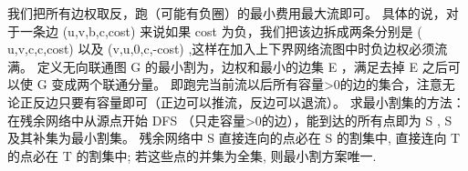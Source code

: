 {}
\markdownRendererSectionEnd \markdownRendererSectionBegin
{}\markdownRendererInterblockSeparator
{}我们把所有边权取反，跑（可能有负圈）的最小费用最大流即可。\markdownRendererParagraphSeparator
{}具体的说，对于一条边\markdownRendererDollarSign{} (u,v,b,c,cost) \markdownRendererDollarSign{}来说如果\markdownRendererDollarSign{} cost \markdownRendererDollarSign{}为负，我们把该边拆成两条分别是\markdownRendererDollarSign{} (\markdownRendererSoftLineBreak
{}u,v,c,c,cost) \markdownRendererDollarSign{}以及\markdownRendererDollarSign{} (v,u,0,c,-cost) \markdownRendererDollarSign{},这样在加入上下界网络流图中时负边权必须流满。\markdownRendererInterblockSeparator
{}
\markdownRendererSectionEnd 
\markdownRendererSectionEnd \markdownRendererSectionBegin
{}\markdownRendererInterblockSeparator
{}定义无向联通图\markdownRendererDollarSign{} G \markdownRendererDollarSign{}的最小割为，边权和最小的边集\markdownRendererDollarSign{} E \markdownRendererDollarSign{}，满足去掉\markdownRendererDollarSign{} E \markdownRendererDollarSign{}之后可以使\markdownRendererDollarSign{} G \markdownRendererDollarSign{}变成两个联通分量。\markdownRendererInterblockSeparator
{}\markdownRendererInterblockSeparator
{}
\markdownRendererSectionEnd \markdownRendererSectionBegin
{}\markdownRendererInterblockSeparator
{}\markdownRendererSectionBegin
\markdownRendererSectionBegin
{}\markdownRendererInterblockSeparator
{}即跑完当前流以后所有容量>0的边的集合，注意无论正反边只要有容量即可（正边可以推流，反边可以退流）。\markdownRendererInterblockSeparator
{}
\markdownRendererSectionEnd \markdownRendererSectionBegin
{}\markdownRendererInterblockSeparator
{}求最小割集的方法：在残余网络中从源点开始\markdownRendererDollarSign{} DFS \markdownRendererDollarSign{}（只走容量>0的边），能到达的所有点即为\markdownRendererDollarSign{} S \markdownRendererDollarSign{},\markdownRendererDollarSign{} S \markdownRendererDollarSign{}及其补集为最小割集。\markdownRendererInterblockSeparator
{}
\markdownRendererSectionEnd \markdownRendererSectionBegin
{}\markdownRendererInterblockSeparator
{}残余网络中\markdownRendererDollarSign{} S \markdownRendererDollarSign{}直接连向的点必在\markdownRendererDollarSign{} S \markdownRendererDollarSign{}的割集中, 直接连向\markdownRendererDollarSign{} T \markdownRendererDollarSign{}的点必在\markdownRendererDollarSign{} T \markdownRendererDollarSign{}的割集中; 若这些点的并集为全集, 则最小割方案唯一.\markdownRendererParagraphSeparator
